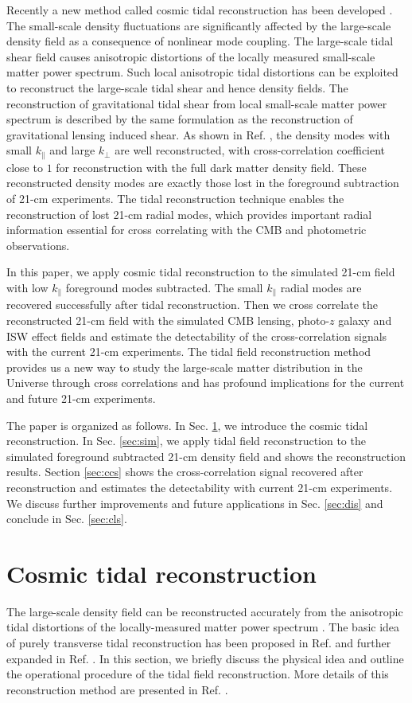 \documentclass[prd,superscriptaddress,floatfix,notitlepage,nofootinbib,reprint]{revtex4-1}
\newcommand{\kpa}{k_\parallel}
\newcommand{\kpe}{k_\perp}
\begin{document}
Recently a new method called cosmic tidal reconstruction has been developed
\cite{2012Tides,2016Tides}. 
The small-scale density fluctuations are significantly affected by the 
large-scale density field as a consequence of nonlinear mode coupling.
The large-scale tidal shear field causes anisotropic distortions of the locally
measured small-scale matter power spectrum. 
Such local anisotropic tidal distortions can be exploited to reconstruct the 
large-scale tidal shear and hence density fields.
The reconstruction of gravitational tidal shear from local small-scale matter 
power spectrum is described by the same formulation as the reconstruction of 
gravitational lensing induced shear. 
As shown in Ref. \cite{2016Tides}, the density modes with small $\kpa$ 
and large $\kpe$ are well reconstructed, with cross-correlation coefficient
close to $1$ for reconstruction with the full dark matter density field.
These reconstructed density modes are exactly those lost in the foreground 
subtraction of 21-cm experiments. 
The tidal reconstruction technique enables the reconstruction of lost 21-cm 
radial modes, which provides important radial information essential for cross 
correlating with the CMB and photometric observations.

In this paper, we apply cosmic tidal reconstruction to the simulated 21-cm 
field with low $\kpa$ foreground modes subtracted. The small $\kpa$ radial 
modes are recovered successfully after tidal reconstruction.
Then we cross correlate the reconstructed 21-cm field with the simulated CMB 
lensing, photo-$z$ galaxy and ISW effect fields and estimate the detectability
of the cross-correlation signals with the current 21-cm experiments.
The tidal field reconstruction method provides us a new way to study the 
large-scale matter distribution in the Universe through cross correlations 
and has profound implications for the current and future 21-cm experiments.

The paper is organized as follows.
In Sec. \ref{sec:rec}, we introduce the cosmic tidal reconstruction.
In Sec. \ref{sec:sim}, we apply tidal field reconstruction to the simulated 
foreground subtracted 21-cm density field and shows the reconstruction results.
Section \ref{sec:ccs} shows the cross-correlation signal recovered after
reconstruction and estimates the detectability with current 21-cm experiments.
We discuss further improvements and future applications in Sec. \ref{sec:dis} 
and conclude in Sec. \ref{sec:cls}.


\section{Cosmic tidal reconstruction}
\label{sec:rec}
The large-scale density field can be reconstructed accurately from the 
anisotropic tidal distortions of the locally-measured matter power spectrum
\cite{2012Tides,2016Tides}.
The basic idea of purely transverse tidal reconstruction has been proposed in 
Ref. \cite{2012Tides} and further expanded in Ref. \cite{2016Tides}.
In this section, we briefly discuss the physical idea and outline the 
operational procedure of the tidal field reconstruction. More details of this 
reconstruction method are presented in Ref. \cite{2016Tides}.
\end{document}
